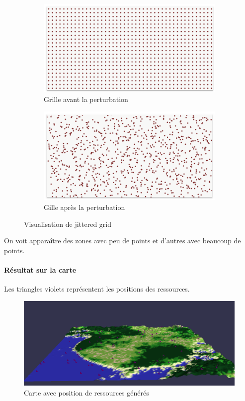 \begin{figure}[!h]
    \centering
    \begin{subfigure}{0.4\linewidth}
        \centering
        \includegraphics[width=\linewidth]{images/grille.png}
        \caption{Grille avant la perturbation}
        \label{fig:image_avant_expansion}
    \end{subfigure}
    \hfill
    \begin{subfigure}{0.4\linewidth}
        \centering
        \includegraphics[width=\linewidth]{images/jitter.png}
        \caption{Gille après la perturbation}
        \label{fig:histo_avant_expansion}
    \end{subfigure}
    \caption{Visualisation de jittered grid}
\end{figure}

On voit apparaître des zones avec peu de points et d'autres avec beaucoup de points.

\paragraph{Résultat sur la carte}
Les triangles violets représentent les positions des ressources.
\begin{figure}[!h]
    \centering
    \includegraphics[width=0.5\linewidth]{images/mapjitter.png}
    \caption{Carte avec position de ressources générés}
    \label{fig:enter-label}
\end{figure}

